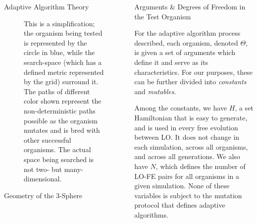 \documentclass[14pt]{beamer}
\begin{document}
\begin{frame}
\begin{columns}
\begin{column}{.45\textwidth}
\begin{block}{Adaptive Algorithm Theory}
\begin{figure}[htpb]
	\centering
		\caption{
		This is a simplification; the organism being tested is represented by the circle in blue, while the search-space (which has a defined metric represented by the grid) surround it. The paths of different color shown represent the non-deterministic paths possible as the organism mutates and is bred with other successful organisms. The actual space being searched is not two- but many-dimensional.
		}
	\end{figure} 
\end{block}
				\vspace{1em}
	\begin{exampleblock}{Geometry of the 3-Sphere}

\end{exampleblock}


					\end{column}
			
			\begin{column}{.45\textwidth}
			
				\begin{block}{Arguments \& Degrees of Freedom in the Test Organism}


	For the adaptive algorithm process described, each organism, denoted $\Theta$, is given a set of arguments which define it and serve as its characteristics. For our purposes, these can be further divided into \emph{constants} and \emph{mutables}. 

	Among the constants, we have $H$, a set Hamiltonian that is easy to generate, and is used in every free evolution between LO. It does not change in each simulation, across all organisms, and across all generations. We also have $N$, which defines the number of LO-FE pairs for all organisms in a given simulation. None of these variables is subject to the mutation protocol that defines adaptive algorithms. 


\end{block}
\end{column}
\end{columns}
\end{frame}
\end{document}
